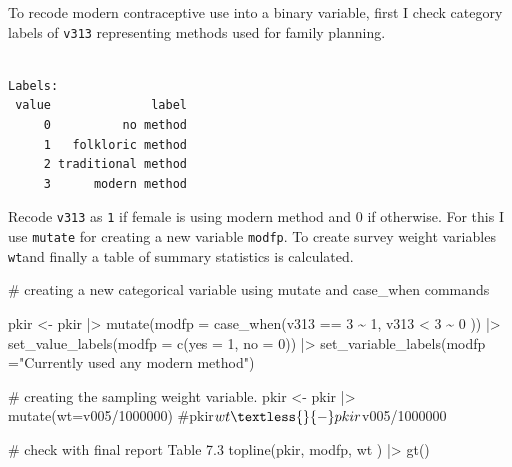 \documentclass[
  letterpaper,
  DIV=11,
  numbers=noendperiod]{scrartcl}
\newenvironment{Shaded}{\begin{snugshade}}{\end{snugshade}}
\newcommand{\AttributeTok}[1]{\textcolor[rgb]{0.40,0.45,0.13}{#1}}
\newcommand{\CommentTok}[1]{\textcolor[rgb]{0.37,0.37,0.37}{#1}}
\newcommand{\DecValTok}[1]{\textcolor[rgb]{0.68,0.00,0.00}{#1}}
\newcommand{\FunctionTok}[1]{\textcolor[rgb]{0.28,0.35,0.67}{#1}}
\newcommand{\NormalTok}[1]{\textcolor[rgb]{0.00,0.23,0.31}{#1}}
\newcommand{\OtherTok}[1]{\textcolor[rgb]{0.00,0.23,0.31}{#1}}
\newcommand{\SpecialCharTok}[1]{\textcolor[rgb]{0.37,0.37,0.37}{#1}}
\newcommand{\StringTok}[1]{\textcolor[rgb]{0.13,0.47,0.30}{#1}}
\begin{document}
To recode modern contraceptive use into a binary variable, first I check
category labels of \texttt{v313} representing methods used for family
planning.

\begin{Shaded}
\end{Shaded}

\begin{verbatim}

Labels:
 value              label
     0          no method
     1   folkloric method
     2 traditional method
     3      modern method
\end{verbatim}

Recode \texttt{v313} as \texttt{1} if female is using modern method and
0 if otherwise. For this I use \texttt{mutate} for creating a new
variable \texttt{modfp}. To create survey weight variables
\texttt{wt}and finally a table of summary statistics is calculated.

\begin{Shaded}
\begin{Highlighting}[]
\CommentTok{\# creating a new categorical variable using mutate and case\_when commands}

\NormalTok{pkir }\OtherTok{\textless{}{-}}\NormalTok{ pkir }\SpecialCharTok{|\textgreater{}}
  \FunctionTok{mutate}\NormalTok{(}\AttributeTok{modfp =}
           \FunctionTok{case\_when}\NormalTok{(v313 }\SpecialCharTok{==} \DecValTok{3} \SpecialCharTok{\textasciitilde{}} \DecValTok{1}\NormalTok{,}
\NormalTok{                     v313 }\SpecialCharTok{\textless{}} \DecValTok{3} \SpecialCharTok{\textasciitilde{}} \DecValTok{0}\NormalTok{ )) }\SpecialCharTok{|\textgreater{}}
  \FunctionTok{set\_value\_labels}\NormalTok{(}\AttributeTok{modfp =} \FunctionTok{c}\NormalTok{(}\AttributeTok{yes =} \DecValTok{1}\NormalTok{, }\AttributeTok{no =} \DecValTok{0}\NormalTok{)) }\SpecialCharTok{|\textgreater{}}
  \FunctionTok{set\_variable\_labels}\NormalTok{(}\AttributeTok{modfp =}\StringTok{"Currently used any modern method"}\NormalTok{)}

\CommentTok{\# creating the sampling weight variable. }
\NormalTok{pkir }\OtherTok{\textless{}{-}}\NormalTok{ pkir }\SpecialCharTok{|\textgreater{}} \FunctionTok{mutate}\NormalTok{(}\AttributeTok{wt=}\NormalTok{v005}\SpecialCharTok{/}\DecValTok{1000000}\NormalTok{)}
\CommentTok{\#pkir$wt \textless{}{-} pkir$v005/1000000}

\CommentTok{\# check with final report Table 7.3}
\FunctionTok{topline}\NormalTok{(pkir, modfp, wt ) }\SpecialCharTok{|\textgreater{}} \FunctionTok{gt}\NormalTok{()}
\end{Highlighting}
\end{Shaded}
\end{document}
